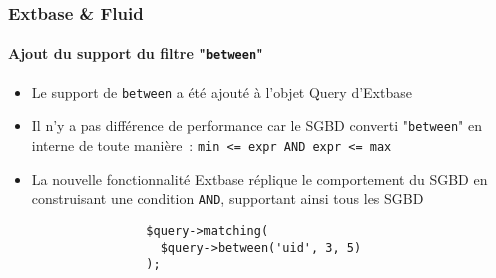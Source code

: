 
\begin{frame}[fragile]
	\frametitle{Extbase \& Fluid}
	\framesubtitle{Ajout du support du filtre "\texttt{between}"}

	\begin{itemize}

		\item Le support de \texttt{between} a été ajouté à l'objet Query d'Extbase

		\item Il n'y a pas différence de performance car le SGBD converti
			"\texttt{between}" en interne de toute manière~: \texttt{min <= expr AND expr <= max}

		\item La nouvelle fonctionnalité Extbase réplique le comportement du SGBD en construisant
			une condition \texttt{AND}, supportant ainsi tous les SGBD

			\begin{lstlisting}
				$query->matching(
				  $query->between('uid', 3, 5)
				);
			\end{lstlisting}

	\end{itemize}

\end{frame}


